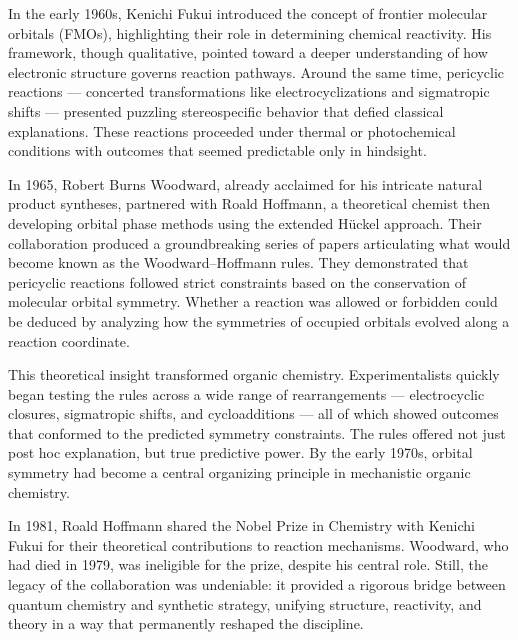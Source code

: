 \begin{historical}
In the early 1960s, Kenichi Fukui introduced the concept of frontier molecular orbitals (FMOs), highlighting their role in determining chemical reactivity. His framework, though qualitative, pointed toward a deeper understanding of how electronic structure governs reaction pathways. Around the same time, pericyclic reactions — concerted transformations like electrocyclizations and sigmatropic shifts — presented puzzling stereospecific behavior that defied classical explanations. These reactions proceeded under thermal or photochemical conditions with outcomes that seemed predictable only in hindsight.

In 1965, Robert Burns Woodward, already acclaimed for his intricate natural product syntheses, partnered with Roald Hoffmann, a theoretical chemist then developing orbital phase methods using the extended Hückel approach. Their collaboration produced a groundbreaking series of papers articulating what would become known as the Woodward–Hoffmann rules. They demonstrated that pericyclic reactions followed strict constraints based on the conservation of molecular orbital symmetry. Whether a reaction was allowed or forbidden could be deduced by analyzing how the symmetries of occupied orbitals evolved along a reaction coordinate.

This theoretical insight transformed organic chemistry. Experimentalists quickly began testing the rules across a wide range of rearrangements — electrocyclic closures, sigmatropic shifts, and cycloadditions — all of which showed outcomes that conformed to the predicted symmetry constraints. The rules offered not just post hoc explanation, but true predictive power. By the early 1970s, orbital symmetry had become a central organizing principle in mechanistic organic chemistry.

In 1981, Roald Hoffmann shared the Nobel Prize in Chemistry with Kenichi Fukui for their theoretical contributions to reaction mechanisms. Woodward, who had died in 1979, was ineligible for the prize, despite his central role. Still, the legacy of the collaboration was undeniable: it provided a rigorous bridge between quantum chemistry and synthetic strategy, unifying structure, reactivity, and theory in a way that permanently reshaped the discipline.
\end{historical}
